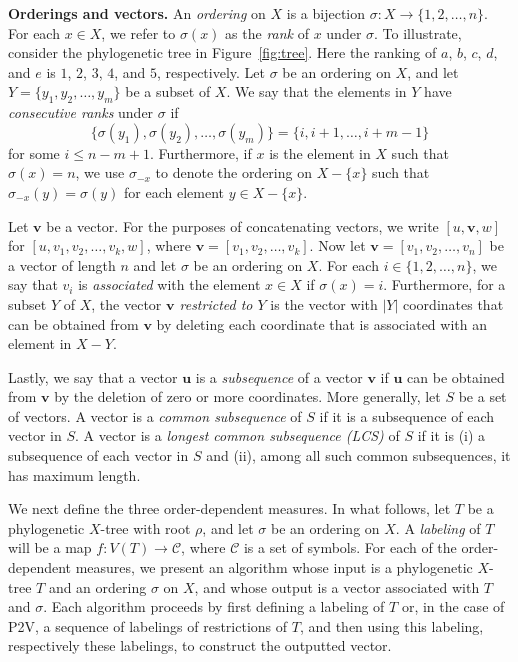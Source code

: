 \documentclass{article}
\begin{document}
\noindent
{\bf Orderings and vectors.}
An {\em ordering} on $X$ is a bijection $\sigma:X\rightarrow\{1, 2, \ldots, n\}$. For each $x \in X$, we refer to $\sigma(x)$ as the {\em rank} of $x$ under $\sigma$. To illustrate, consider the phylogenetic tree in Figure~\ref{fig:tree}. Here the ranking of $a$, $b$, $c$, $d$, and $e$ is $1$, $2$, $3$, $4$, and $5$, respectively. Let $\sigma$ be an ordering on $X$, and let $Y=\{y_1, y_2, \ldots, y_m\}$ be a subset of $X$. We say that the elements in $Y$ have {\em consecutive ranks} under $\sigma$ if
$$\{\sigma(y_1), \sigma(y_2), \ldots, \sigma(y_m)\}=\{i,i+1,\ldots,i+m-1\}$$
for some $i\leq n-m+1$. Furthermore, if $x$ is the element in $X$ such that $\sigma(x)=n$, we use $\sigma_{-x}$ to denote the ordering on $X-\{x\}$ such that $\sigma_{-x}(y)=\sigma(y)$ for each element $y\in X-\{x\}$. 

Let $\mathbf{v}$ be a vector. For the purposes of concatenating vectors, we write $[u, \mathbf{v}, w]$ for $[u,v_1, v_2, \ldots, v_k, w]$, where $\mathbf{v}= [v_1, v_2, \ldots, v_k]$. Now let $\mathbf{v}=[v_1, v_2,\ldots, v_n]$ be a vector of length $n$ and let $\sigma$ be an ordering on $X$. For each $i\in\{1,2,\ldots,n\}$, we say that $v_i$ is {\em associated} with the element $x\in X$ if $\sigma(x)=i$. Furthermore, for a subset $Y$ of $X$, the vector {\em $\mathbf{v}$ restricted to $Y$} is the vector with $|Y|$ coordinates that can be obtained from $\mathbf{v}$ by deleting each coordinate that is associated with an element in $X-Y$.

Lastly, we say that a vector $\mathbf{u}$ is a {\em subsequence} of a vector $\mathbf{v}$ if $\mathbf{u}$ can be obtained from $\mathbf{v}$ by the deletion of zero or more coordinates. More generally, let $S$ be a set of vectors. A vector is a {\em common subsequence} of $S$ if it is a subsequence of each vector in $S$. A vector is a {\em longest common subsequence (LCS)} of $S$ if it is (i) a subsequence of each vector in $S$ and (ii), among all such common subsequences, it has maximum length.

We next define the three order-dependent measures. In what follows, let $T$ be a phylogenetic $X$-tree with root $\rho$, and let $\sigma$ be an ordering on $X$. A {\em labeling} of $T$ will be a map $f:V(T) \rightarrow \mathcal{C}$, where $\mathcal{C}$ is a set of symbols. For each of the order-dependent measures, we present an algorithm whose input is a phylogenetic $X$-tree $T$ and an ordering $\sigma$ on $X$, and whose output is a vector associated with $T$ and $\sigma$. Each algorithm proceeds by first defining a labeling of $T$ or, in the case of P2V, a sequence of labelings of restrictions of $T$, and then using this labeling, respectively these labelings, to construct the outputted vector.
\end{document}
